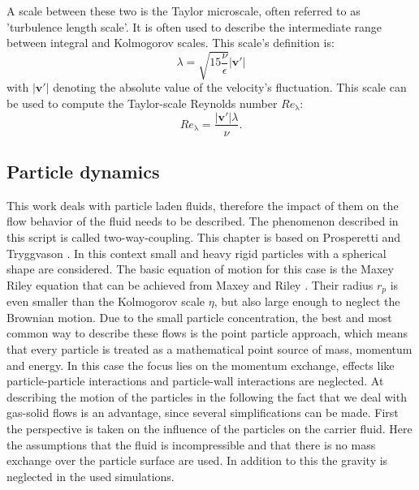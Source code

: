 \documentclass[11pt,a4paper,openany,oneside,parskip=half*]{article}
\renewcommand*\vec[1]{\boldsymbol{#1}}
\begin{document}
\newline
A scale between these two is the Taylor microscale, often referred to as 'turbulence length scale'. 
It is often used to describe the intermediate range between integral and Kolmogorov scales. 
This scale's definition is: 
\begin{equation}
\lambda = \sqrt{15 \frac{\nu}{\epsilon}} |\vec{v'}|
\end{equation}
with $|\vec{v'}|$ denoting the absolute value of the velocity's fluctuation. This scale can be used to compute the Taylor-scale Reynolds number $Re_\mathrm{\lambda}$:
\begin{equation}
Re_\mathrm{\lambda} = \frac{|\vec{v'}| \lambda}{\nu}.
\end{equation}
\pagebreak
\subsection{Particle dynamics} %
This work deals with particle laden fluids, therefore the impact of them on the flow behavior of the fluid needs to be described. The phenomenon described in this script is called two-way-coupling. This chapter is based on Prosperetti and Tryggvason \cite{computationalMethodsforMultiphaseFlow}.
\newline
In this context small and heavy rigid particles with a spherical shape are considered. The basic equation of motion for this case is the Maxey Riley equation that can be achieved from Maxey and Riley \cite{EquationOfMotionForASmallRigidSphereInANonuniformFlow}. Their radius $ r_p $ is even smaller than the Kolmogorov scale $ \eta $, but also large enough to neglect the Brownian motion.
\newline
Due to the small particle concentration, the best and most common way to describe these flows is the point particle approach, which means that every particle is treated as a mathematical point source of mass, momentum and energy. In this case the focus lies on the momentum exchange, effects like particle-particle interactions and particle-wall interactions are neglected.  
\newline
At describing the motion of the particles in the following the fact that we deal with gas-solid flows is an advantage, since several simplifications can be made.
\newline
First the perspective is taken on the influence of the particles on the carrier fluid. Here the assumptions that the fluid is incompressible and that there is no mass exchange over the particle surface are used. In addition to this the gravity is neglected in the used simulations.
\end{document}

